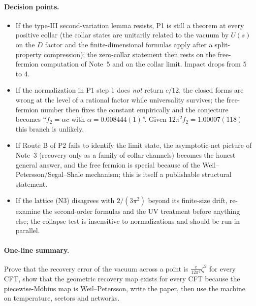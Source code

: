\documentclass[11pt]{article}
\theoremstyle{accent}
\theoremstyle{definition}
\begin{document}
\paragraph{Decision points.}
\begin{itemize}
\item If the type-III second-variation lemma resists, P1 is still a theorem at every positive collar (the collar states are unitarily related to the vacuum by \(U(s)\) on the \(D\) factor and the finite-dimensional formulas apply after a split-property compression); the zero-collar statement then rests on the free-fermion computation of Note~5 and on the collar limit. Impact drops from 5 to 4.
\item If the normalization in P1 step 1 does \emph{not} return \(c/12\), the closed forms are wrong at the level of a rational factor while universality survives; the free-fermion number then fixes the constant empirically and the conjecture becomes ``\(f_2=\alpha c\) with \(\alpha=0.008444(1)\)''.  Given \(12\pi^2f_2=1.00007(118)\) this branch is unlikely.
\item If Route B of P2 fails to identify the limit state, the asymptotic-net picture of Note~3 (recovery only as a family of collar channels) becomes the honest general answer, and the free fermion is special because of the Weil--Petersson/Segal--Shale mechanism; this is itself a publishable structural statement.
\item If the lattice (N3) disagrees with \(2/(3\pi^2)\) beyond its finite-size drift, re-examine the second-order formulas and the UV treatment before anything else; the collapse test is insensitive to normalizations and should be run in parallel.
\end{itemize}

\paragraph{One-line summary.}
Prove that the recovery error of the vacuum across a point is \(\frac{c}{12\pi^2}\zeta^2\) for every CFT, show that the geometric recovery map exists for every CFT because the piecewise-M\"obius map is Weil--Petersson, write the paper, then use the machine on temperature, sectors and networks.
\end{document}
